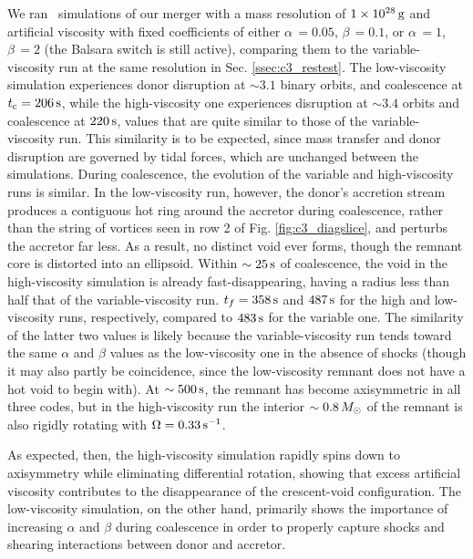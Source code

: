 We ran \gasoline\ simulations of our merger with a mass resolution of $1\times10^{28}\,\mathrm{g}$ and artificial viscosity with fixed coefficients of either $\alpha\,=0.05$, $\beta\,=0.1$, or $\alpha\,=1$, $\beta\,=2$ (the Balsara switch is still active), comparing them to the variable-viscosity run at the same resolution in Sec. \ref{ssec:c3_restest}.  The low-viscosity simulation experiences donor disruption at $\sim3.1$ binary orbits, and coalescence at $\tcoal = 206\,\mrm{s}$, while the high-viscosity one experiences disruption at $\sim3.4$ orbits and coalescence at $220\,\mathrm{s}$, values that are quite similar to those of the variable-viscosity run.  This similarity is to be expected, since mass transfer and donor disruption are governed by tidal forces, which are unchanged between the simulations.  During coalescence, the evolution of the variable and high-viscosity runs is similar.  In the low-viscosity run, however, the donor's accretion stream produces a contiguous hot ring around the accretor during coalescence, rather than the string of vortices seen in row 2 of Fig. \ref{fig:c3_diagslice}, and perturbs the accretor far less.  As a result, no distinct void ever forms, though the remnant core is distorted into an ellipsoid.  Within $\sim25\,\mathrm{s}$ of coalescence, the void in the high-viscosity simulation is already fast-disappearing, having a radius less than half that of the variable-viscosity run.  $t_f = 358\,\mathrm{s}$ and $487\,\mathrm{s}$ for the high and low-viscosity runs, respectively, compared to $483\,\mathrm{s}$ for the variable one.  The similarity of the latter two values is likely because the variable-viscosity run tends toward the same $\alpha$ and $\beta$ values as the low-viscosity one in the absence of shocks (though it may also partly be coincidence, since the low-viscosity remnant does not have a hot void to begin with).  At $\sim500\,\mathrm{s}$, the remnant has become axisymmetric in all three codes, but in the high-viscosity run the interior $\sim0.8\,\Msun$ of the remnant is also rigidly rotating with $\Omega = 0.33\,\mathrm{s}^{-1}$.


As expected, then, the high-viscosity simulation rapidly spins down to axisymmetry while eliminating differential rotation, showing that excess artificial viscosity contributes to the disappearance of the crescent-void configuration.  The low-viscosity simulation, on the other hand, primarily shows the importance of increasing $\alpha$ and $\beta$ during coalescence in order to properly capture shocks and shearing interactions between donor and accretor.

